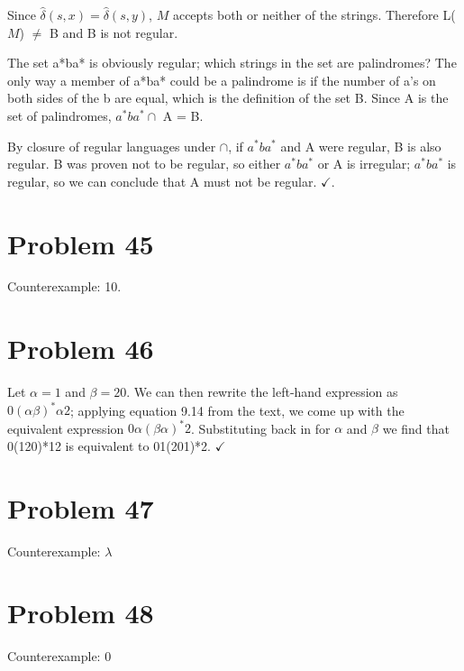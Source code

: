 \documentclass[11pt]{article}
\begin{document}
\begin{enumerate}[(a)]
Since $\hat{\delta}(s, x) = \hat{\delta}(s, y)$, $M$ accepts both or neither of the strings. Therefore L($M$) $\neq$ B and B is not regular.

The set a*ba* is obviously regular; which strings in the set are palindromes? The only way a member of a*ba* could be a palindrome is if the number of a's on both sides of the b are equal, which is the definition of the set B. Since A is the set of palindromes, $a^*ba^* \cap $ A = B. 

By closure of regular languages under $\cap$, if $a^*ba^*$ and A were regular, B is also regular. B was proven not to be regular, so either $a^*ba^*$ or A is irregular; $a^*ba^*$ is regular, so we can conclude that A must not be regular. $\checkmark$.




\end{enumerate}

\section*{Problem 45}

Counterexample: 10.

\section*{Problem 46}

Let $\alpha = 1$ and $\beta = 20$. We can then rewrite the left-hand expression as $0(\alpha \beta)^*\alpha2$; applying equation 9.14 from the text, we come up with the equivalent expression 
$0\alpha(\beta \alpha)^*2$. Substituting back in for $\alpha$ and $\beta$ we find that 0(120)*12 is equivalent to 01(201)*2. $ \checkmark $


\section*{Problem 47}

Counterexample: $\lambda$

\section*{Problem 48}

Counterexample: 0
\end{document}
